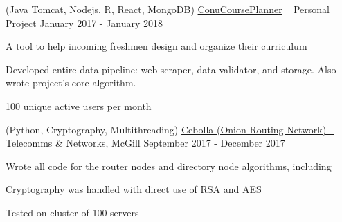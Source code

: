 \begin{cventries}

\cventry
{(Java Tomcat, Nodejs, R, React, MongoDB)} %
{\href{http://conucourseplanner.online}{ConuCoursePlanner} \ \href{https://github.com/stumash/CoursePlanner}{\faGithubSquare\acvHeaderIconSep}} %
{Personal Project} %
{January 2017 - January 2018} %
{ %
\begin{cvitems}
\item {A tool to help incoming freshmen design and organize their curriculum}
\item {Developed entire data pipeline: web scraper, data validator, and storage. Also wrote project's core algorithm.}
\item {100 unique active users per month}
\end{cvitems}
}


\cventry
{(Python, Cryptography, Multithreading)} %
{\href{https://github.com/CamiloGarciaLaRotta/Cebolla}{Cebolla (Onion Routing Network) \ \faGithubSquare\acvHeaderIconSep}} %
{Telecomms \& Networks, McGill} %
{September 2017 - December 2017} %
{ %
\begin{cvitems}
\item {Wrote all code for the router nodes and directory node algorithms, including}
\item {Cryptography was handled with direct use of RSA and AES}
\item {Tested on cluster of 100 servers}
\end{cvitems}
}


\end{cventries}
